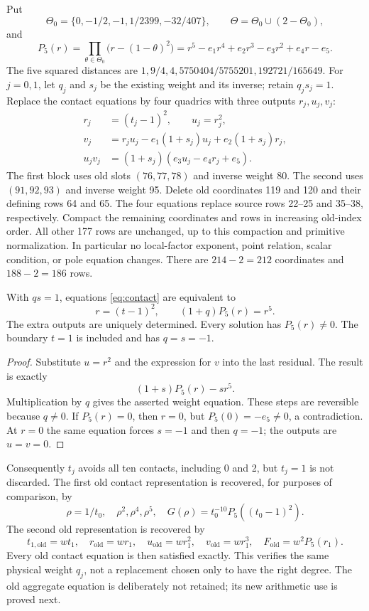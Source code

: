 \documentclass[11pt,a4paper]{article}
\begin{document}
Put
\[
 \Theta_0=\{0,-1/2,-1,1/2399,-32/407\},\qquad
 \Theta=\Theta_0\cup(2-\Theta_0),
\]
and
\[
 P_5(r)=\prod_{\theta\in\Theta_0}\bigl(r-(1-\theta)^2\bigr)
       =r^5-e_1r^4+e_2r^3-e_3r^2+e_4r-e_5.
\]
The five squared distances are
$1,9/4,4,5750404/5755201,192721/165649$.
For $j=0,1$, let $q_j$ and $s_j$ be the existing weight and its
inverse; retain $q_js_j=1$. Replace the contact equations by four
quadrics with three outputs $r_j,u_j,v_j$:
\begin{align}
 r_j&=(t_j-1)^2,\qquad u_j=r_j^2,\\
 v_j&=r_ju_j-e_1(1+s_j)u_j+e_2(1+s_j)r_j,\\
 u_jv_j&=(1+s_j)(e_3u_j-e_4r_j+e_5).\label{eq:contact}
\end{align}
The first block uses old slots $(76,77,78)$ and inverse weight 80.
The second uses $(91,92,93)$ and inverse weight 95. Delete old
coordinates 119 and 120 and their defining rows 64 and 65.
The four equations replace source rows 22--25 and 35--38,
respectively. Compact the remaining coordinates and rows in increasing
old-index order. All other 177 rows are unchanged, up to this
compaction and primitive normalization. In particular no local-factor
exponent, point relation, scalar condition, or pole equation changes.
There are $214-2=212$ coordinates and $188-2=186$ rows.

\begin{lemma}\label{lem:contact}
With $qs=1$, equations \eqref{eq:contact} are equivalent to
\[
             r=(t-1)^2,\qquad (1+q)P_5(r)=r^5.
\]
The extra outputs are uniquely determined. Every solution has
$P_5(r)\ne0$. The boundary $t=1$ is included and has $q=s=-1$.
\end{lemma}
\begin{proof}
Substitute $u=r^2$ and the expression for $v$ into the last residual.
The result is exactly
\[
                         (1+s)P_5(r)-sr^5.
\]
Multiplication by $q$ gives the asserted weight equation. These
steps are reversible because $q\ne0$. If $P_5(r)=0$, then $r=0$,
but $P_5(0)=-e_5\ne0$, a contradiction. At $r=0$ the same equation
forces $s=-1$ and then $q=-1$; the outputs are $u=v=0$.
\end{proof}

Consequently $t_j$ avoids all ten contacts, including 0 and 2, but
$t_j=1$ is not discarded. The first old contact representation is
recovered, for purposes of comparison, by
\[
 \rho=1/t_0,\quad \rho^2,\rho^4,\rho^5,\quad
 G(\rho)=t_0^{-10}P_5((t_0-1)^2).
\]
The second old representation is recovered by
\[
 t_{1,\mathrm{old}}=wt_1,\quad
 r_{\mathrm{old}}=wr_1,\quad
 u_{\mathrm{old}}=wr_1^2,\quad
 v_{\mathrm{old}}=wr_1^3,\quad
 F_{\mathrm{old}}=w^2P_5(r_1).
\]
Every old contact equation is then satisfied exactly. This verifies
the same physical weight $q_j$, not a replacement chosen only to
have the right degree. The old aggregate equation is deliberately
not retained; its new arithmetic use is proved next.
\end{document}
